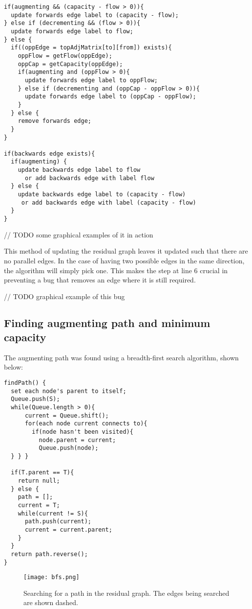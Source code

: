 \documentclass{l4proj}
\begin{document}
\lstset{numbers=left}
\begin{lstlisting}
if(augmenting && (capacity - flow > 0)){
  update forwards edge label to (capacity - flow);
} else if (decrementing && (flow > 0)){
  update forwards edge label to flow;
} else {
  if((oppEdge = topAdjMatrix[to][from]) exists){
    oppFlow = getFlow(oppEdge);
    oppCap = getCapacity(oppEdge);
    if(augmenting and (oppFlow > 0){
      update forwards edge label to oppFlow;
    } else if (decrementing and (oppCap - oppFlow > 0)){
      update forwards edge label to (oppCap - oppFlow);
    }
  } else {
    remove forwards edge;
  }
}

if(backwards edge exists){
  if(augmenting) {
    update backwards edge label to flow
      or add backwards edge with label flow
  } else {
    update backwards edge label to (capacity - flow)
     or add backwards edge with label (capacity - flow)
  }
}
\end{lstlisting}

// TODO some graphical examples of it in action

This method of updating the residual graph leaves it updated such that there are no parallel edges. In the case of having two possible edges in the same direction, the algorithm will simply pick one. This makes the step at line 6 crucial in preventing a bug that removes an edge where it is still required. \label{edge-rem-bug}

// TODO graphical example of this bug

\subsection{Finding augmenting path and minimum capacity}
The augmenting path was found using a breadth-first search algorithm, shown below:
\begin{lstlisting}
findPath() {
  set each node's parent to itself;
  Queue.push(S);
  while(Queue.length > 0){
      current = Queue.shift();
      for(each node current connects to){
        if(node hasn't been visited){
          node.parent = current;
          Queue.push(node);
  } } }

  if(T.parent == T){
    return null;
  } else {
    path = [];
    current = T;
    while(current != S){
      path.push(current);
      current = current.parent;
    }
  }
  return path.reverse();
}
\end{lstlisting}
\begin{figure}[h]
    \centering
    \texttt{[image: bfs.png]}
    \caption{Searching for a path in the residual graph. The edges being searched are shown dashed.}
    \label{fig:my_label}
\end{figure}
\end{document}
